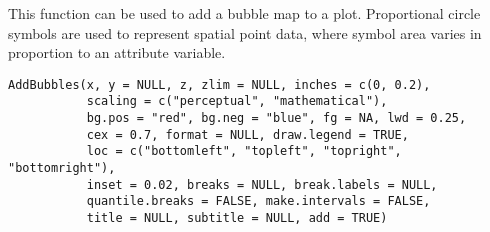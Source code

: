 \documentclass[letterpaper]{book}
\begin{document}
%
\begin{Description}\relax
This function can be used to add a bubble map to a plot.
Proportional circle symbols are used to represent spatial point data, where symbol area varies in proportion to an attribute variable.
\end{Description}
%
\begin{Usage}
\begin{verbatim}
AddBubbles(x, y = NULL, z, zlim = NULL, inches = c(0, 0.2),
           scaling = c("perceptual", "mathematical"),
           bg.pos = "red", bg.neg = "blue", fg = NA, lwd = 0.25,
           cex = 0.7, format = NULL, draw.legend = TRUE,
           loc = c("bottomleft", "topleft", "topright", "bottomright"),
           inset = 0.02, breaks = NULL, break.labels = NULL,
           quantile.breaks = FALSE, make.intervals = FALSE,
           title = NULL, subtitle = NULL, add = TRUE)
\end{verbatim}
\end{Usage}
%
\end{document}
